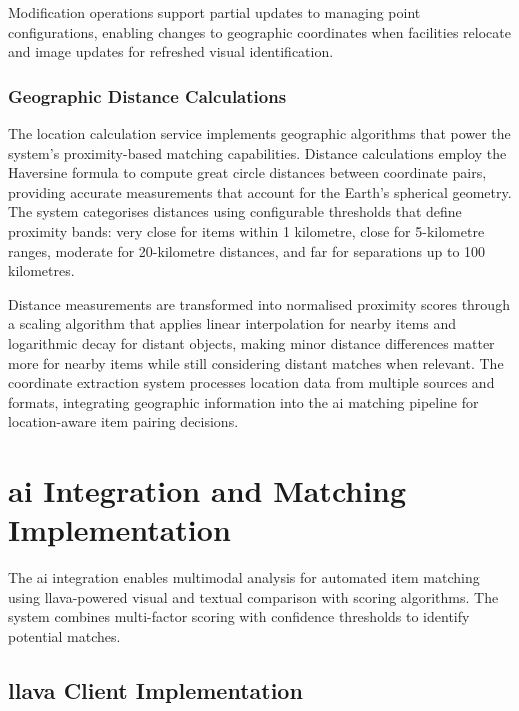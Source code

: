 Modification operations support partial updates to managing point configurations, enabling changes to geographic coordinates when facilities relocate and image updates for refreshed visual identification.

\subsubsection{Geographic Distance Calculations}

The location calculation service implements geographic algorithms that power the system's proximity-based matching capabilities. Distance calculations employ the Haversine formula \cite{Sinnott1984} to compute great circle distances between coordinate pairs, providing accurate measurements that account for the Earth's spherical geometry. The system categorises distances using configurable thresholds that define proximity bands: very close for items within 1 kilometre, close for 5-kilometre ranges, moderate for 20-kilometre distances, and far for separations up to 100 kilometres.

Distance measurements are transformed into normalised proximity scores through a scaling algorithm that applies linear interpolation for nearby items and logarithmic decay for distant objects, making minor distance differences matter more for nearby items while still considering distant matches when relevant. The coordinate extraction system processes location data from multiple sources and formats, integrating geographic information into the \ac{ai} matching pipeline for location-aware item pairing decisions.



\section{\ac{ai} Integration and Matching Implementation} \label{section:ai_integration}

The \ac{ai} integration enables multimodal analysis for automated item matching using \ac{llava}-powered visual and textual comparison with scoring algorithms. The system combines multi-factor scoring with confidence thresholds to identify potential matches.

\subsection{\ac{llava} Client Implementation} \label{subsection:llava_client}

